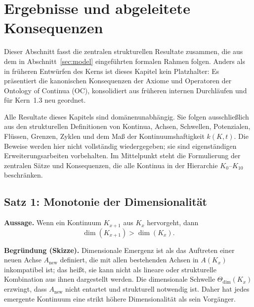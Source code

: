 \section{Ergebnisse und abgeleitete Konsequenzen}
\label{sec:results}

Dieser Abschnitt fasst die zentralen strukturellen Resultate zusammen, die aus dem in Abschnitt~\ref{sec:model} eingeführten formalen Rahmen folgen.
Anders als in früheren Entwürfen des Kerns ist dieses Kapitel kein Platzhalter: Es präsentiert die kanonischen Konsequenzen der Axiome und Operatoren der Ontology of Continua (OC), konsolidiert aus früheren internen Durchläufen und für Kern~1.3 neu geordnet.

Alle Resultate dieses Kapitels sind domänenunabhängig.
Sie folgen ausschließlich aus den strukturellen Definitionen von Kontinua, Achsen, Schwellen, Potenzialen, Flüssen, Grenzen, Zyklen und dem Maß der Kontinuumshaftigkeit \(k(K,t)\).
Die Beweise werden hier nicht vollständig wiedergegeben; sie sind eigenständigen Erweiterungsarbeiten vorbehalten.
Im Mittelpunkt steht die Formulierung der zentralen Sätze und Konsequenzen, die alle Kontinua in der Hierarchie \(K_0\)–\(K_{10}\) beschränken.

\subsection{Satz 1: Monotonie der Dimensionalität}

\textbf{Aussage.}
Wenn ein Kontinuum \(K_{x+1}\) aus \(K_x\) hervorgeht, dann
\[
    \dim(K_{x+1}) > \dim(K_x).
\]

\textbf{Begründung (Skizze).}
Dimensionale Emergenz ist als das Auftreten einer neuen Achse \(A_{\mathrm{new}}\) definiert, die mit allen bestehenden Achsen in \(A(K_x)\) inkompatibel ist; das heißt, sie kann nicht als lineare oder strukturelle Kombination aus ihnen dargestellt werden.
Die dimensionale Schwelle \(\Theta_{\mathrm{dim}}(K_x)\) erzwingt, dass \(A_{\mathrm{new}}\) nicht entartet und strukturell notwendig ist.
Daher hat jedes emergente Kontinuum eine strikt höhere Dimensionalität als sein Vorgänger.

